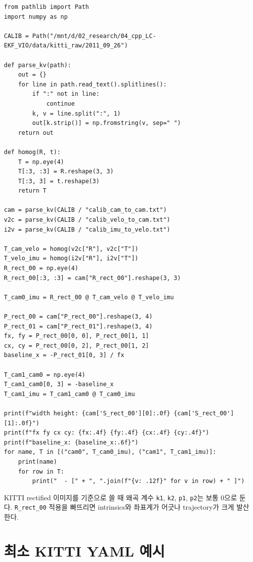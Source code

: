 \documentclass[11pt,a4paper,oneside]{report}
\begin{document}
\begin{lstlisting}[style=python,caption={KITTI calib에서 YAML 값 추출}]
from pathlib import Path
import numpy as np

CALIB = Path("/mnt/d/02_research/04_cpp_LC-EKF_VIO/data/kitti_raw/2011_09_26")

def parse_kv(path):
    out = {}
    for line in path.read_text().splitlines():
        if ":" not in line:
            continue
        k, v = line.split(":", 1)
        out[k.strip()] = np.fromstring(v, sep=" ")
    return out

def homog(R, t):
    T = np.eye(4)
    T[:3, :3] = R.reshape(3, 3)
    T[:3, 3] = t.reshape(3)
    return T

cam = parse_kv(CALIB / "calib_cam_to_cam.txt")
v2c = parse_kv(CALIB / "calib_velo_to_cam.txt")
i2v = parse_kv(CALIB / "calib_imu_to_velo.txt")

T_cam_velo = homog(v2c["R"], v2c["T"])
T_velo_imu = homog(i2v["R"], i2v["T"])
R_rect_00 = np.eye(4)
R_rect_00[:3, :3] = cam["R_rect_00"].reshape(3, 3)

T_cam0_imu = R_rect_00 @ T_cam_velo @ T_velo_imu

P_rect_00 = cam["P_rect_00"].reshape(3, 4)
P_rect_01 = cam["P_rect_01"].reshape(3, 4)
fx, fy = P_rect_00[0, 0], P_rect_00[1, 1]
cx, cy = P_rect_00[0, 2], P_rect_00[1, 2]
baseline_x = -P_rect_01[0, 3] / fx

T_cam1_cam0 = np.eye(4)
T_cam1_cam0[0, 3] = -baseline_x
T_cam1_imu = T_cam1_cam0 @ T_cam0_imu

print(f"width height: {cam['S_rect_00'][0]:.0f} {cam['S_rect_00'][1]:.0f}")
print(f"fx fy cx cy: {fx:.4f} {fy:.4f} {cx:.4f} {cy:.4f}")
print(f"baseline_x: {baseline_x:.6f}")
for name, T in [("cam0", T_cam0_imu), ("cam1", T_cam1_imu)]:
    print(name)
    for row in T:
        print("  - [" + ", ".join(f"{v: .12f}" for v in row) + " ]")
\end{lstlisting}

\begin{warnbox}
KITTI rectified 이미지를 기준으로 쓸 때 왜곡 계수 \texttt{k1}, \texttt{k2}, \texttt{p1},
\texttt{p2}는 보통 0으로 둔다. \texttt{R\_rect\_00} 적용을 빠뜨리면 intrinsics와 좌표계가
어긋나 trajectory가 크게 발산한다.
\end{warnbox}

\section{최소 KITTI YAML 예시}
\end{document}
